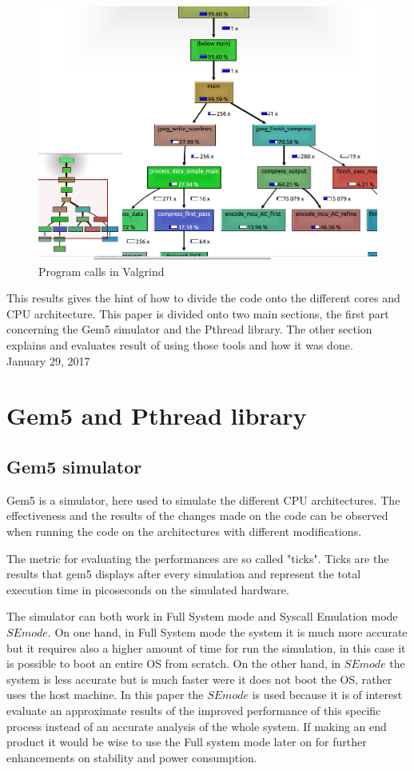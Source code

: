 \documentclass[journal]{IEEEtran}
\begin{document}
\begin{figure}[!h]
	\includegraphics[width=\linewidth]{valgrind}
	\caption{Program calls in Valgrind}
	\label{fig:valgrind}
\end{figure} 

This results gives the hint of how to divide the code onto the different cores and CPU architecture. This paper is divided onto two main sections, the first part concerning the Gem5 simulator and the Pthread library. The other section explains and evaluates result of using those tools and how it was done.\\

 
\hfill January 29, 2017


\section{Gem5 and Pthread library}
\subsection{Gem5 simulator}
Gem5 is a simulator, here used to simulate the different CPU architectures. The effectiveness and the results of the changes made on the code can be observed when running the code on the architectures with different modifications. 

The metric for evaluating the performances are so called "ticks". Ticks are the results that gem5 displays after every simulation and represent the total execution time in picoseconds on the simulated hardware.
 
The simulator can both work in Full System mode and Syscall Emulation mode \(SE mode\). On one hand, in Full System mode the system it is much more accurate but it requires also a higher amount of time for run the simulation, in this case it is possible to boot an entire OS from scratch. On the other hand, in \(SE mode\) the system is less accurate but is much faster were it does not boot the OS, rather uses the host machine.
In this paper the \(SE mode\) is used because it is of interest evaluate an approximate results of the improved performance of this specific process instead of an accurate analysis of the whole system. If making an end product it would be wise to use the Full system mode later on for further enhancements on stability and power consumption.
\end{document}

